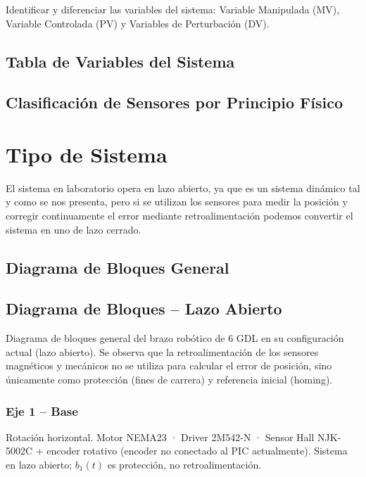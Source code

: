 \documentclass[11pt]{article}
\begin{document}
Identificar y diferenciar las variables del sistema: Variable Manipulada (MV), Variable Controlada (PV) y Variables de Perturbación (DV).



\subsection{Tabla de Variables del Sistema}



\subsection{Clasificación de Sensores por Principio Físico}

\section{Tipo de Sistema}

El sistema en laboratorio opera en lazo abierto, ya que es un sistema dinámico tal y como se nos presenta, pero si se utilizan los sensores para medir la posición y corregir continuamente el error mediante retroalimentación podemos convertir el sistema en uno de lazo cerrado.

\subsection{Diagrama de Bloques General}

\subsection{Diagrama de Bloques – Lazo Abierto}

Diagrama de bloques general del brazo robótico de 6 GDL en su configuración actual (lazo abierto). Se observa que la retroalimentación de los sensores magnéticos y mecánicos no se utiliza para calcular el error de posición, sino únicamente como protección (fines de carrera) y referencia inicial (homing).

\subsubsection{Eje 1 – Base}

Rotación horizontal. Motor NEMA23 · Driver 2M542-N · Sensor Hall NJK-5002C + encoder rotativo (encoder no conectado al PIC actualmente). Sistema en lazo abierto; $b_1(t)$ es protección, no retroalimentación.
\end{document}
